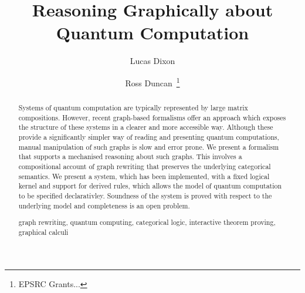 \documentclass[runningheads]{llncs}
\newcommand{\keywords}[1]{\par\addvspace\baselineskip
\noindent\keywordname\enspace\ignorespaces#1}
\begin{document}
\mainmatter  %

\title{Reasoning Graphically about Quantum Computation}


%
%
\author{Lucas Dixon \and Ross Duncan~\thanks{EPSRC Grants...}%
}
%


%
%
\maketitle


\begin{abstract}
  Systems of quantum computation are typically represented by large
  matrix compositions. However, recent graph-based formalisms offer an
  approach which exposes the structure of these systems in a clearer
  and more accessible way. Although these provide a significantly
  simpler way of reading and presenting quantum computations, manual
  manipulation of such graphs is slow and error prone. We
  present a formalism that supports a mechanised reasoning about such
  graphs. This involves a compositional account of graph rewriting
  that preserves the underlying categorical semantics. We present a
  system, which has been implemented, with a fixed logical kernel and
  support for derived rules, which allows the model of quantum
  computation  to be specified declarativley.
  Soundness of the 
  system is proved with respect to the underlying model and
  completeness is an open problem.

  \keywords{graph rewriting, quantum computing, categorical
    logic, interactive theorem proving, graphical calculi}
\end{abstract}
\end{document}
